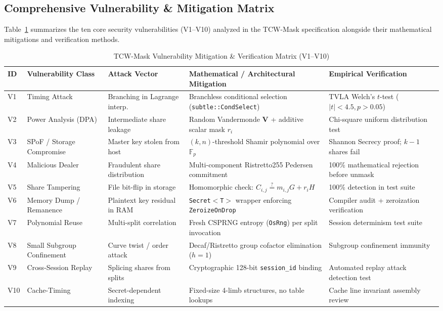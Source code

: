 \documentclass[10pt,journal,compsoc]{IEEEtran}
\begin{document}
\subsection{Comprehensive Vulnerability \& Mitigation Matrix}
Table~\ref{tab:vuln_matrix} summarizes the ten core security vulnerabilities (V1--V10) analyzed in the TCW-Mask specification alongside their mathematical mitigations and verification methods.

\begin{table}[!t]
\centering
\caption{TCW-Mask Vulnerability Mitigation \& Verification Matrix (V1--V10)}
\label{tab:vuln_matrix}
\begin{tabular}{@{}llllp{5cm}@{}}
\toprule
\textbf{ID} & \textbf{Vulnerability Class} & \textbf{Attack Vector} & \textbf{Mathematical / Architectural Mitigation} & \textbf{Empirical Verification} \\ \midrule
V1 & Timing Attack & Branching in Lagrange interp. & Branchless conditional selection (\texttt{subtle::CondSelect}) & TVLA Welch's $t$-test ($|t| < 4.5, p > 0.05$) \\
V2 & Power Analysis (DPA) & Intermediate share leakage & Random Vandermonde $\mathbf{V}$ + additive scalar mask $r_i$ & Chi-square uniform distribution test \\
V3 & SPoF / Storage Compromise & Master key stolen from host & $(k, n)$-threshold Shamir polynomial over $\mathbb{F}_p$ & Shannon Secrecy proof; $k-1$ shares fail \\
V4 & Malicious Dealer & Fraudulent share distribution & Multi-component Ristretto255 Pedersen commitment & 100\% mathematical rejection before unmask \\
V5 & Share Tampering & File bit-flip in storage & Homomorphic check: $C_{i,j} \stackrel{?}{=} m_{i,j}G + r_i H$ & 100\% detection in test suite \\
V6 & Memory Dump / Remanence & Plaintext key residual in RAM & \texttt{Secret$<$T$>$} wrapper enforcing \texttt{ZeroizeOnDrop} & Compiler audit + zeroization verification \\
V7 & Polynomial Reuse & Multi-split correlation & Fresh CSPRNG entropy (\texttt{OsRng}) per split invocation & Session determinism test suite \\
V8 & Small Subgroup Confinement & Curve twist / order attack & Decaf/Ristretto group cofactor elimination ($h=1$) & Subgroup confinement immunity \\
V9 & Cross-Session Replay & Splicing shares from splits & Cryptographic 128-bit \texttt{session\_id} binding & Automated replay attack detection test \\
V10 & Cache-Timing & Secret-dependent indexing & Fixed-size 4-limb structures, no table lookups & Cache line invariant assembly review \\ \bottomrule
\end{tabular}
\end{table}
\end{document}
